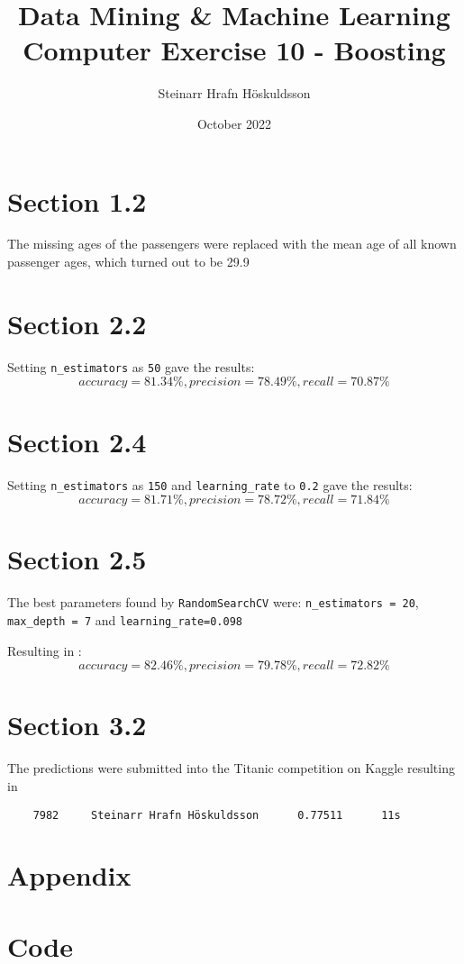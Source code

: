 \documentclass{article}
\title{Data Mining \& Machine Learning \\ \large Computer Exercise 10 - Boosting}
\author{Steinarr Hrafn Höskuldsson}
\date{October 2022}
\newcommand{\mycomment}[1]{}
\begin{document}
\maketitle
\mycomment{
\begin{figure}[h]
    \centering
    \texttt{[image: LAB3/Basic1.png]}
    \caption{"Switch test" Breadboard set up}
    \label{fig:Switch_test}
\end{figure}



}


\section*{Section 1.2}
 
 The missing ages of the passengers were replaced with the mean age of all known passenger ages, which turned out to be 29.9
 

\section*{Section 2.2}
Setting \verb!n_estimators! as \verb"50" gave the results:
$$ accuracy = 81.34\% ,  precision = 78.49\% ,  recall = 70.87\%$$


\section*{Section 2.4}
Setting \verb!n_estimators! as \verb"150"  and \verb!learning_rate! to \verb!0.2! gave the results:
$$ accuracy =81.71\% ,  precision = 78.72\% ,  recall = 71.84\%$$

\section*{Section 2.5}
The best parameters found by \verb"RandomSearchCV" were: \verb"n_estimators = 20", \verb"max_depth = 7" and \verb"learning_rate=0.098"

Resulting in :
$$ accuracy =82.46\% ,  precision = 79.78\% ,  recall = 72.82\%$$

\section*{Section 3.2}
The predictions were submitted into the Titanic competition on Kaggle resulting in 

\begin{verbatim}
    7982     Steinarr Hrafn Höskuldsson      0.77511      11s
\end{verbatim}

\newpage
\section*{Appendix}
\appendix
\section{Code}


\end{document}
